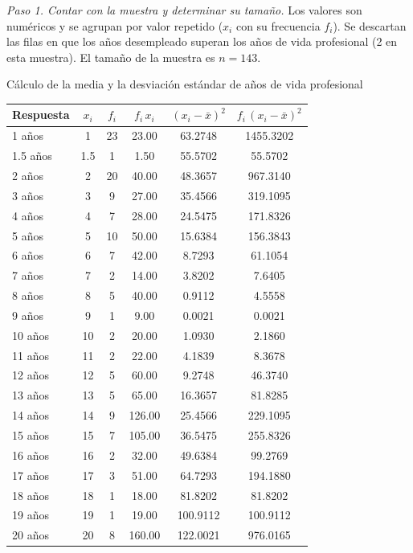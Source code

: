 \textit{Paso 1. Contar con la muestra y determinar su tamaño.} Los valores son numéricos y se agrupan por valor repetido ($x_i$ con su frecuencia $f_i$). Se descartan las filas en que los años desempleado superan los años de vida profesional (2 en esta muestra). El tamaño de la muestra es $n = 143$.

\begin{mitabla}{Cálculo de la media y la desviación estándar de años de vida profesional}
\begin{tabular}{lccccc}
\toprule
Respuesta & $x_i$ & $f_i$ & $f_i\,x_i$ & $(x_i-\bar{x})^2$ & $f_i\,(x_i-\bar{x})^2$ \\
\midrule
1 años & 1 & 23 & 23.00 & 63.2748 & 1455.3202 \\
1.5 años & 1.5 & 1 & 1.50 & 55.5702 & 55.5702 \\
2 años & 2 & 20 & 40.00 & 48.3657 & 967.3140 \\
3 años & 3 & 9 & 27.00 & 35.4566 & 319.1095 \\
4 años & 4 & 7 & 28.00 & 24.5475 & 171.8326 \\
5 años & 5 & 10 & 50.00 & 15.6384 & 156.3843 \\
6 años & 6 & 7 & 42.00 & 8.7293 & 61.1054 \\
7 años & 7 & 2 & 14.00 & 3.8202 & 7.6405 \\
8 años & 8 & 5 & 40.00 & 0.9112 & 4.5558 \\
9 años & 9 & 1 & 9.00 & 0.0021 & 0.0021 \\
10 años & 10 & 2 & 20.00 & 1.0930 & 2.1860 \\
11 años & 11 & 2 & 22.00 & 4.1839 & 8.3678 \\
12 años & 12 & 5 & 60.00 & 9.2748 & 46.3740 \\
13 años & 13 & 5 & 65.00 & 16.3657 & 81.8285 \\
14 años & 14 & 9 & 126.00 & 25.4566 & 229.1095 \\
15 años & 15 & 7 & 105.00 & 36.5475 & 255.8326 \\
16 años & 16 & 2 & 32.00 & 49.6384 & 99.2769 \\
17 años & 17 & 3 & 51.00 & 64.7293 & 194.1880 \\
18 años & 18 & 1 & 18.00 & 81.8202 & 81.8202 \\
19 años & 19 & 1 & 19.00 & 100.9112 & 100.9112 \\
20 años & 20 & 8 & 160.00 & 122.0021 & 976.0165 \\

\end{tabular}
\end{mitabla}
